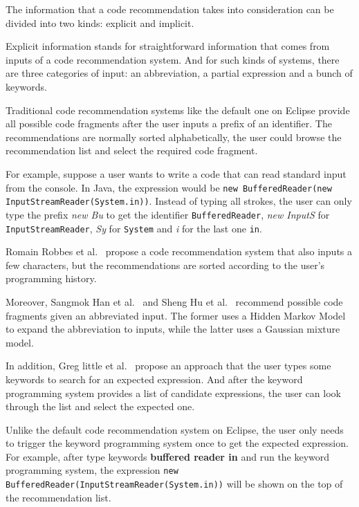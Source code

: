 \documentclass[PRO,english]{ipsj}
\begin{document}

The information that a code recommendation takes into consideration can be divided into two kinds: explicit and implicit. 

Explicit information stands for straightforward information that comes from inputs of a code recommendation system. And for such kinds of systems, there are three categories of input: an abbreviation, a partial expression and a bunch of keywords.

Traditional code recommendation systems like the default one on Eclipse provide all possible code fragments after the user inputs a prefix of an identifier. The recommendations are normally sorted alphabetically, the user could browse the recommendation list and select the required code fragment.  

For example, suppose a user wants to write a code that can read standard input from the console. In Java, the expression would be \texttt{new BufferedReader(new InputStreamReader(System.in))}. Instead of typing all strokes, the user can only type the prefix \textit{new Bu} to get the identifier \texttt{BufferedReader}, \textit{new InputS} for \texttt{InputStreamReader}, \textit{Sy} for \texttt{System} and \textit{i} for the last one \texttt{in}. 

Romain Robbes et al.~\cite{ProgramHistory} propose a code recommendation system that also inputs a few characters, but the recommendations are sorted according to the user’s programming history.

Moreover, Sangmok Han et al.~\cite{Sangmok} and Sheng Hu et al.~\cite{Sheng} recommend possible code fragments given an abbreviated input. The former uses a Hidden Markov Model to expand the abbreviation to inputs, while the latter uses a Gaussian mixture model. 

In addition, Greg little et al.~\cite{KeywordProgramming} propose an approach that the user types some keywords to search for an expected expression. And after the keyword programming system provides a list of candidate expressions, the user can look through the list and select the expected one. 

Unlike the default code recommendation system on Eclipse, the user only needs to trigger the keyword programming system once to get the expected expression. For example, after type keywords \textbf{buffered reader in} and run the keyword programming system, the expression \texttt{new BufferedReader(InputStreamReader(System.in))} will be shown on the top of the recommendation list.
\end{document}
